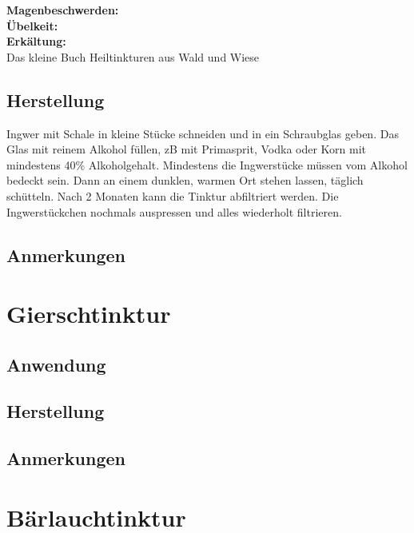 \textbf{Magenbeschwerden:} \\ 

\textbf{Übelkeit:} \\ 

\textbf{Erkältung:} \\ 


Das kleine Buch Heiltinkturen aus Wald und Wiese


\subsection{Herstellung}

Ingwer mit Schale in kleine Stücke schneiden und in ein Schraubglas geben. Das Glas mit reinem Alkohol füllen, zB mit Primasprit, Vodka oder Korn mit mindestens 40\% Alkoholgehalt. Mindestens die Ingwerstücke müssen vom Alkohol bedeckt sein. Dann an einem dunklen, warmen Ort stehen lassen, täglich schütteln. Nach 2 Monaten kann die Tinktur abfiltriert werden. Die Ingwerstückchen nochmals auspressen und alles wiederholt filtrieren.

\subsection{Anmerkungen}






\section{Gierschtinktur}

\subsection{Anwendung}

\subsection{Herstellung}

\subsection{Anmerkungen}







\section{Bärlauchtinktur}

